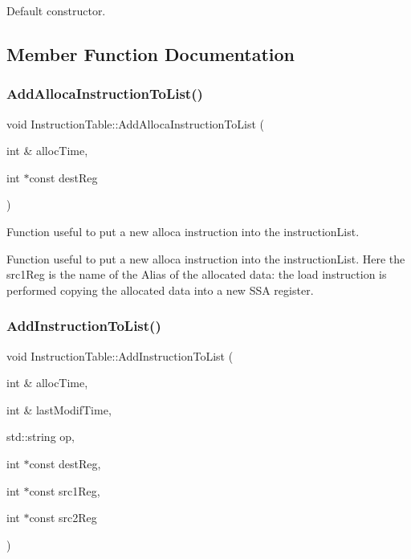 Default constructor. 



\subsection{Member Function Documentation}
\mbox{\label{classoctantis_1_1InstructionTable_a8209ad0dedb13565de1712d3636fec0e}} 
\subsubsection{\texorpdfstring{Add\+Alloca\+Instruction\+To\+List()}{AddAllocaInstructionToList()}}
{\footnotesize\ttfamily void Instruction\+Table\+::\+Add\+Alloca\+Instruction\+To\+List (\begin{DoxyParamCaption}\item[{int \&}]{alloc\+Time,  }\item[{int $\ast$const}]{dest\+Reg }\end{DoxyParamCaption})}



Function useful to put a new alloca instruction into the instruction\+List. 

Function useful to put a new alloca instruction into the instruction\+List. Here the src1\+Reg is the name of the Alias of the allocated data\+: the load instruction is performed copying the allocated data into a new S\+SA register. \mbox{\label{classoctantis_1_1InstructionTable_a060292d882ceac0db27958a2ab0c52e7}} 
\subsubsection{\texorpdfstring{Add\+Instruction\+To\+List()}{AddInstructionToList()}}
{\footnotesize\ttfamily void Instruction\+Table\+::\+Add\+Instruction\+To\+List (\begin{DoxyParamCaption}\item[{int \&}]{alloc\+Time,  }\item[{int \&}]{last\+Modif\+Time,  }\item[{std\+::string}]{op,  }\item[{int $\ast$const}]{dest\+Reg,  }\item[{int $\ast$const}]{src1\+Reg,  }\item[{int $\ast$const}]{src2\+Reg }\end{DoxyParamCaption})}



